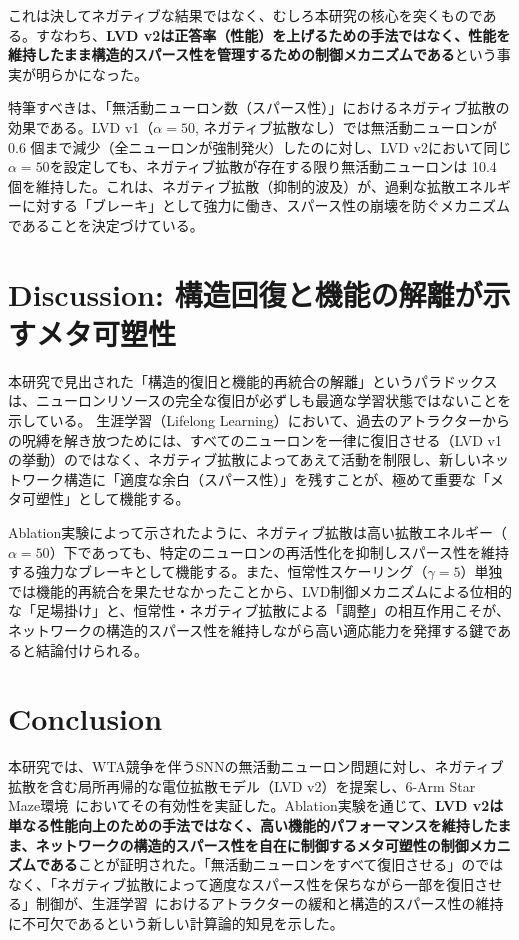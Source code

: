 \documentclass[submit]{ipsj}
\begin{document}
これは決してネガティブな結果ではなく、むしろ本研究の核心を突くものである。すなわち、\textbf{LVD v2は正答率（性能）を上げるための手法ではなく、性能を維持したまま構造的スパース性を管理するための制御メカニズムである}という事実が明らかになった。

特筆すべきは、「無活動ニューロン数（スパース性）」におけるネガティブ拡散の効果である。LVD v1（$\alpha=50$, ネガティブ拡散なし）では無活動ニューロンが 0.6 個まで減少（全ニューロンが強制発火）したのに対し、LVD v2において同じ$\alpha=50$を設定しても、ネガティブ拡散が存在する限り無活動ニューロンは 10.4 個を維持した。これは、ネガティブ拡散（抑制的波及）が、過剰な拡散エネルギーに対する「ブレーキ」として強力に働き、スパース性の崩壊を防ぐメカニズムであることを決定づけている。

\section{Discussion: 構造回復と機能の解離が示すメタ可塑性}
本研究で見出された「構造的復旧と機能的再統合の解離」というパラドックスは、ニューロンリソースの完全な復旧が必ずしも最適な学習状態ではないことを示している。
生涯学習（Lifelong Learning）において、過去のアトラクターからの呪縛を解き放つためには、すべてのニューロンを一律に復旧させる（LVD v1の挙動）のではなく、ネガティブ拡散によってあえて活動を制限し、新しいネットワーク構造に「適度な余白（スパース性）」を残すことが、極めて重要な「メタ可塑性」として機能する。

Ablation実験によって示されたように、ネガティブ拡散は高い拡散エネルギー（$\alpha=50$）下であっても、特定のニューロンの再活性化を抑制しスパース性を維持する強力なブレーキとして機能する。また、恒常性スケーリング（$\gamma=5$）単独では機能的再統合を果たせなかったことから、LVD制御メカニズムによる位相的な「足場掛け」と、恒常性・ネガティブ拡散による「調整」の相互作用こそが、ネットワークの構造的スパース性を維持しながら高い適応能力を発揮する鍵であると結論付けられる。
\section{Conclusion}
本研究では、WTA競争を伴うSNNの無活動ニューロン問題に対し、ネガティブ拡散を含む局所再帰的な電位拡散モデル（LVD v2）を提案し、6-Arm Star Maze環境~\cite{tolman1946spatial,olton1976spatial}においてその有効性を実証した。Ablation実験を通じて、\textbf{LVD v2は単なる性能向上のための手法ではなく、高い機能的パフォーマンスを維持したまま、ネットワークの構造的スパース性を自在に制御するメタ可塑性の制御メカニズムである}ことが証明された。「無活動ニューロンをすべて復旧させる」のではなく、「ネガティブ拡散によって適度なスパース性を保ちながら一部を復旧させる」制御が、生涯学習~\cite{parisi2019continual}におけるアトラクターの緩和と構造的スパース性の維持に不可欠であるという新しい計算論的知見を示した。

\clearpage


\end{document}
